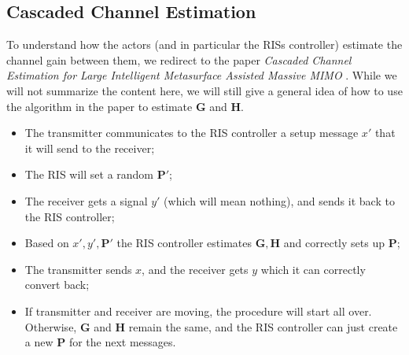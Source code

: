 \newpage
\subsection{Cascaded Channel Estimation}
To understand how the actors (and in particular the RISs controller) estimate the channel gain between them, we redirect to the paper \textit{Cascaded Channel Estimation for Large Intelligent Metasurface Assisted Massive MIMO} \cite{8879620}. While we will not summarize the content here, we will still give a general idea of how to use the algorithm in the paper to estimate $\bm{G}$ and $\bm{H}$.
\begin{itemize}
  \item The transmitter communicates to the RIS controller a setup message $x'$ that it will send to the receiver;
  \item The RIS will set a random $\bm{P}'$;
  \item The receiver gets a signal $y'$ (which will mean nothing), and sends it back to the RIS controller;
  \item Based on $x', y', \bm{P}'$ the RIS controller estimates $\bm{G}, \bm{H}$ and correctly sets up $\bm{P}$;
  \item The transmitter sends $x$, and the receiver gets $y$ which it can correctly convert back;
  \item If transmitter and receiver are moving, the procedure will start all over. Otherwise, $\bm{G}$ and $\bm{H}$ remain the same, and the RIS controller can just create a new $\bm{P}$ for the next messages.
\end{itemize}